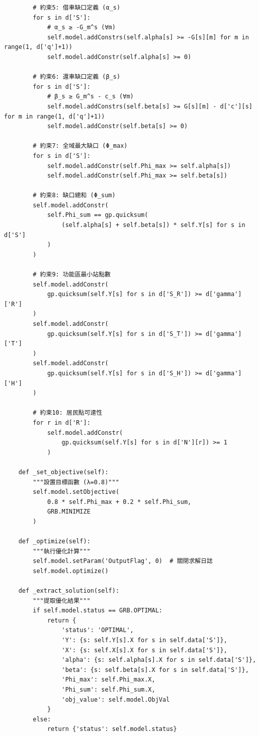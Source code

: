 \begin{verbatim}
        # 約束5: 借車缺口定義 (α_s)
        for s in d['S']:
            # α_s ≥ -G_m^s (∀m)
            self.model.addConstrs(self.alpha[s] >= -G[s][m] for m in range(1, d['q']+1))
            self.model.addConstr(self.alpha[s] >= 0)
        
        # 約束6: 還車缺口定義 (β_s)
        for s in d['S']:
            # β_s ≥ G_m^s - c_s (∀m)
            self.model.addConstrs(self.beta[s] >= G[s][m] - d['c'][s] for m in range(1, d['q']+1))
            self.model.addConstr(self.beta[s] >= 0)
        
        # 約束7: 全域最大缺口 (Φ_max)
        for s in d['S']:
            self.model.addConstr(self.Phi_max >= self.alpha[s])
            self.model.addConstr(self.Phi_max >= self.beta[s])
        
        # 約束8: 缺口總和 (Φ_sum)
        self.model.addConstr(
            self.Phi_sum == gp.quicksum(
                (self.alpha[s] + self.beta[s]) * self.Y[s] for s in d['S']
            )
        )
        
        # 約束9: 功能區最小站點數
        self.model.addConstr(
            gp.quicksum(self.Y[s] for s in d['S_R']) >= d['gamma']['R']
        )
        self.model.addConstr(
            gp.quicksum(self.Y[s] for s in d['S_T']) >= d['gamma']['T']
        )
        self.model.addConstr(
            gp.quicksum(self.Y[s] for s in d['S_H']) >= d['gamma']['H']
        )
        
        # 約束10: 居民點可達性
        for r in d['R']:
            self.model.addConstr(
                gp.quicksum(self.Y[s] for s in d['N'][r]) >= 1
            )

    def _set_objective(self):
        """設置目標函數 (λ=0.8)"""
        self.model.setObjective(
            0.8 * self.Phi_max + 0.2 * self.Phi_sum,
            GRB.MINIMIZE
        )

    def _optimize(self):
        """執行優化計算"""
        self.model.setParam('OutputFlag', 0)  # 關閉求解日誌
        self.model.optimize()

    def _extract_solution(self):
        """提取優化結果"""
        if self.model.status == GRB.OPTIMAL:
            return {
                'status': 'OPTIMAL',
                'Y': {s: self.Y[s].X for s in self.data['S']},
                'X': {s: self.X[s].X for s in self.data['S']},
                'alpha': {s: self.alpha[s].X for s in self.data['S']},
                'beta': {s: self.beta[s].X for s in self.data['S']},
                'Phi_max': self.Phi_max.X,
                'Phi_sum': self.Phi_sum.X,
                'obj_value': self.model.ObjVal
            }
        else:
            return {'status': self.model.status}
\end{verbatim}